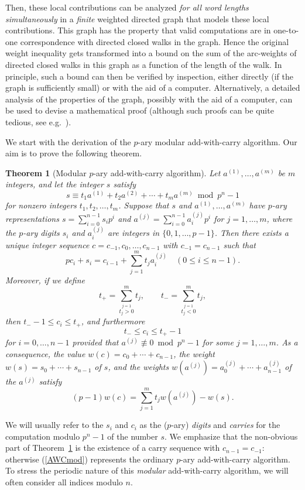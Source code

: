 \documentclass[11pt, reqno]{amsart}
\newtheorem{teor}{Theorem}[section]
\newcommand{\beql}[1]{\begin{equation} \label{#1}}
\newcommand{\eeql}{\end{equation}}
\begin{document}
Then, these local contributions can be analyzed {\em for all word
lengths simultaneously\/} in a {\em finite\/} weighted directed
graph that models these local contributions. This graph has the
property that valid computations are in one-to-one correspondence
with directed closed walks in the graph. Hence the original weight
inequality gets transformed into a bound on the sum of the
arc-weights of directed closed walks in this graph as a function of
the length of the walk. In principle, such a bound can then be
verified by inspection, either directly (if the graph is
sufficiently small) or with the aid of a computer. Alternatively, a
detailed analysis of the properties of the graph, possibly with the
aid of a computer, can be used to devise a mathematical proof
(although such proofs can be quite tedious, see e.g.\ \cite{niho}).

We start with the derivation of the $p$-ary modular add-with-carry algorithm.
Our aim is to prove the following theorem.
\begin{teor}[Modular $p$-ary add-with-carry algorithm] \label{TAWCmod}
Let $a^{(1)}, \ldots, a^{(m)}$ be $m$ integers, and let
the integer $s$ satisfy
\[s \equiv t_1a^{(1)}+t_2a^{(2)}+\cdots +t_ma^{(m)} \bmod p^n-1\]
for nonzero integers $t_1, t_2, \ldots, t_m$. Suppose that $s$ and
$a^{(1)}, \ldots, a^{(m)}$ have $p$-ary representations $s =
\sum_{i=0}^{n-1}s_ip^i$ and $ a^{(j)}= \sum_{i=0}^{n-1}a^{(j)}_ip^i$
for $j=1, \ldots, m$, where the $p$-ary digits $s_i$ and $a^{(j)}_i$
are integers in $\{0,1,\ldots, p-1\}$. Then there exists a {\em
unique\/} integer sequence $c=c_{-1}, c_0, \ldots, c_{n-1}$ with
$c_{-1}=c_{n-1}$ such that \beql{AWCmod} pc_i + s_i = c_{i-1} +
\sum_{j=1}^m t_ja_i^{(j)} \quad (0\leq i\leq n-1).\eeql Moreover, if
we define
\[ t_+=\sum_{\stackrel{j=1}{t_j>0}}^{m}t_j,\qquad
t_-=\sum_{\stackrel{j=1}{t_j<0}}^{m}t_j,\] then $t_--1\leq c_i \leq
t_+$, and furthermore \beql{AWCmodbound} t_-\leq c_i \leq t_+-1
\eeql for $i=0, \ldots, n-1$ provided that $a^{(j)}\not\equiv0\bmod
p^n-1$ for some $j=1, \ldots, m$. As a consequence, the value
$w(c)=c_0+\cdots+c_{n-1}$, the weight $w(s)=s_0+\cdots +s_{n-1}$ of
$s$, and the weights $w(a^{(j)})= a^{(j)}_0+\cdots +a^{(j)}_{n-1}$
of the $a^{(j)}$ satisfy \beql{AWCmodc} (p-1)w(c)=\sum_{j=1}^m
t_jw(a^{(j)}) - w(s). \eeql
\end{teor}

We will usually refer to the $s_i$ and $c_i$ as the ($p$-ary) {\em
digits\/} and {\em carries\/} for the computation modulo $p^n-1$ of
the number $s$. We emphasize that the non-obvious part of
Theorem~\ref{TAWCmod} is the existence of a carry sequence with
$c_{n-1}=c_{-1}$: otherwise (\ref{AWCmod}) represents the ordinary
$p$-ary add-with-carry algorithm. To stress the periodic nature of
this {\em modular\/} add-with-carry algorithm, we will often
consider all indices modulo $n$.
\end{document}
